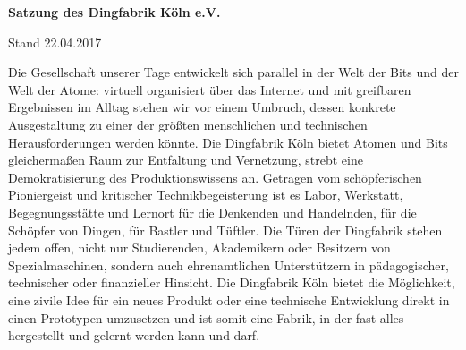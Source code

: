 \documentclass[12pt,ngerman]{scrartcl}
\begin{document}
\begin{center}
\Huge\textbf{Satzung des Dingfabrik Köln e.V.}\vspace*{1cm}

\Large{Stand 22.04.2017}
\end{center}\vspace*{1cm}

Die Gesellschaft unserer Tage entwickelt sich parallel in der Welt der Bits und der Welt der Atome: virtuell organisiert über das Internet und mit greifbaren Ergebnissen im Alltag stehen wir vor einem Umbruch, dessen konkrete Ausgestaltung zu einer der größten menschlichen und technischen Herausforderungen werden könnte. Die Dingfabrik Köln bietet Atomen und Bits gleichermaßen Raum zur Entfaltung und Vernetzung, strebt eine Demokratisierung des Produktionswissens an. Getragen vom schöpferischen Pioniergeist und kritischer Technikbegeisterung ist es Labor, Werkstatt, Begegnungsstätte und Lernort für die Denkenden und Handelnden, für die Schöpfer von Dingen, für Bastler und Tüftler. Die Türen der Dingfabrik stehen jedem offen, nicht nur Studierenden, Akademikern oder Besitzern von Spezialmaschinen, sondern auch ehrenamtlichen Unterstützern in pädagogischer, technischer oder finanzieller Hinsicht. Die Dingfabrik Köln bietet die Möglichkeit, eine zivile Idee für ein neues Produkt oder eine technische Entwicklung direkt in einen Prototypen umzusetzen und ist somit eine Fabrik, in der fast alles hergestellt und gelernt werden kann und darf.
\end{document}
